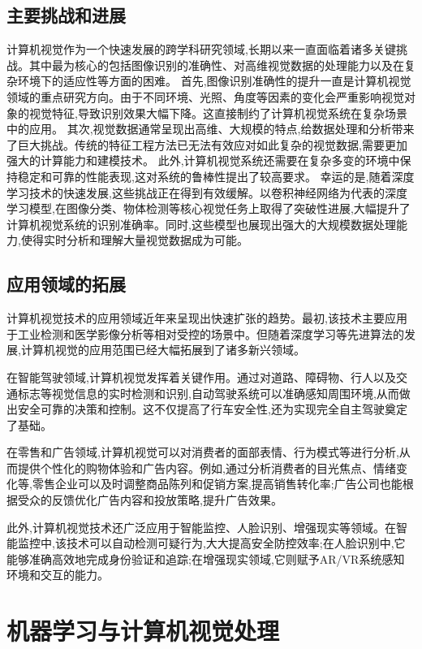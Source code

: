 \documentclass[a4paper]{article}
\newcommand{\sectionbreak}{\clearpage} %
\theoremstyle{definition}
\theoremstyle{plain}
\theoremstyle{remark}
\begin{document}
\subsection{主要挑战和进展}
计算机视觉作为一个快速发展的跨学科研究领域,长期以来一直面临着诸多关键挑战。其中最为核心的包括图像识别的准确性、对高维视觉数据的处理能力以及在复杂环境下的适应性等方面的困难。
首先,图像识别准确性的提升一直是计算机视觉领域的重点研究方向。由于不同环境、光照、角度等因素的变化会严重影响视觉对象的视觉特征,导致识别效果大幅下降。这直接制约了计算机视觉系统在复杂场景中的应用。
其次,视觉数据通常呈现出高维、大规模的特点,给数据处理和分析带来了巨大挑战。传统的特征工程方法已无法有效应对如此复杂的视觉数据,需要更加强大的计算能力和建模技术。
此外,计算机视觉系统还需要在复杂多变的环境中保持稳定和可靠的性能表现,这对系统的鲁棒性提出了较高要求。
幸运的是,随着深度学习技术的快速发展,这些挑战正在得到有效缓解。以卷积神经网络为代表的深度学习模型,在图像分类、物体检测等核心视觉任务上取得了突破性进展,大幅提升了计算机视觉系统的识别准确率。同时,这些模型也展现出强大的大规模数据处理能力,使得实时分析和理解大量视觉数据成为可能。
\subsection{应用领域的拓展}
计算机视觉技术的应用领域近年来呈现出快速扩张的趋势。最初,该技术主要应用于工业检测和医学影像分析等相对受控的场景中。但随着深度学习等先进算法的发展,计算机视觉的应用范围已经大幅拓展到了诸多新兴领域。

在智能驾驶领域,计算机视觉发挥着关键作用。通过对道路、障碍物、行人以及交通标志等视觉信息的实时检测和识别,自动驾驶系统可以准确感知周围环境,从而做出安全可靠的决策和控制。这不仅提高了行车安全性,还为实现完全自主驾驶奠定了基础。

在零售和广告领域,计算机视觉可以对消费者的面部表情、行为模式等进行分析,从而提供个性化的购物体验和广告内容。例如,通过分析消费者的目光焦点、情绪变化等,零售企业可以及时调整商品陈列和促销方案,提高销售转化率;广告公司也能根据受众的反馈优化广告内容和投放策略,提升广告效果。

此外,计算机视觉技术还广泛应用于智能监控、人脸识别、增强现实等领域。在智能监控中,该技术可以自动检测可疑行为,大大提高安全防控效率;在人脸识别中,它能够准确高效地完成身份验证和追踪;在增强现实领域,它则赋予AR/VR系统感知环境和交互的能力。

\sectionbreak

\section{机器学习与计算机视觉处理}
\end{document}
